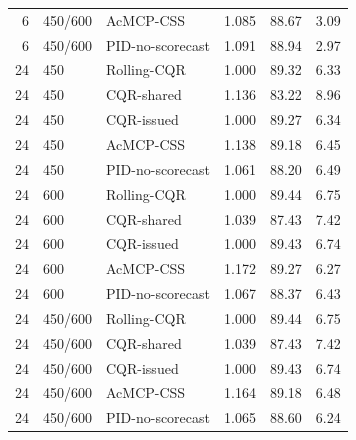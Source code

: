\begin{tabular}{rllrrr}
6 & 450/600 & AcMCP-CSS & 1.085 & 88.67 & 3.09 \\
6 & 450/600 & PID-no-scorecast & 1.091 & 88.94 & 2.97 \\
24 & 450 & Rolling-CQR & 1.000 & 89.32 & 6.33 \\
24 & 450 & CQR-shared & 1.136 & 83.22 & 8.96 \\
24 & 450 & CQR-issued & 1.000 & 89.27 & 6.34 \\
24 & 450 & AcMCP-CSS & 1.138 & 89.18 & 6.45 \\
24 & 450 & PID-no-scorecast & 1.061 & 88.20 & 6.49 \\
24 & 600 & Rolling-CQR & 1.000 & 89.44 & 6.75 \\
24 & 600 & CQR-shared & 1.039 & 87.43 & 7.42 \\
24 & 600 & CQR-issued & 1.000 & 89.43 & 6.74 \\
24 & 600 & AcMCP-CSS & 1.172 & 89.27 & 6.27 \\
24 & 600 & PID-no-scorecast & 1.067 & 88.37 & 6.43 \\
24 & 450/600 & Rolling-CQR & 1.000 & 89.44 & 6.75 \\
24 & 450/600 & CQR-shared & 1.039 & 87.43 & 7.42 \\
24 & 450/600 & CQR-issued & 1.000 & 89.43 & 6.74 \\
24 & 450/600 & AcMCP-CSS & 1.164 & 89.18 & 6.48 \\
24 & 450/600 & PID-no-scorecast & 1.065 & 88.60 & 6.24 \\
\bottomrule
\end{tabular}
